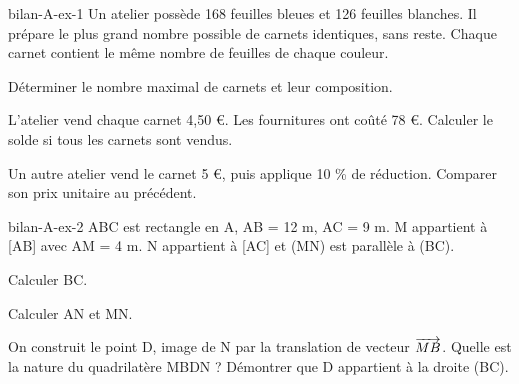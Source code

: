 \begin{blocEdition}{bilan-A-ex-1}
Un atelier possède 168 feuilles bleues et 126 feuilles blanches. Il prépare le plus grand nombre possible de carnets identiques, sans reste. Chaque carnet contient le même nombre de feuilles de chaque couleur.\begin{questions}
\item Déterminer le nombre maximal de carnets et leur composition.
\item L’atelier vend chaque carnet 4,50 €. Les fournitures ont coûté 78 €. Calculer le solde si tous les carnets sont vendus.
\item Un autre atelier vend le carnet 5 €, puis applique 10 \% de réduction. Comparer son prix unitaire au précédent.
\end{questions}\par{}
\end{blocEdition}
\begin{blocEdition}{bilan-A-ex-2}
ABC est rectangle en A, AB = 12 m, AC = 9 m. M appartient à [AB] avec AM = 4 m. N appartient à [AC] et (MN) est parallèle à (BC).\begin{questions}
\item Calculer BC.
\item Calculer AN et MN.
\item On construit le point D, image de N par la translation de vecteur $\overrightarrow{MB}$. Quelle est la nature du quadrilatère MBDN ? Démontrer que D appartient à la droite (BC).
\end{questions}\par{}\label{fig-bilan-A-ex-2}

\end{blocEdition}
